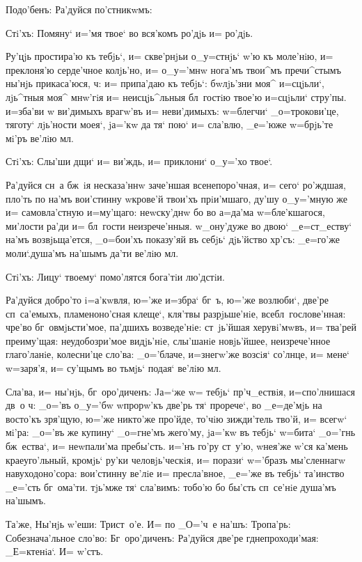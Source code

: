 Подо'бенъ: Ра'дуйся по'стникwмъ:

Стi'хъ: Помяну` и='мя твое` во вся'комъ ро'дjь и= 
ро'дjь. 

Ру'цjь простира'ю къ тебjь`, и= скве'рнjьи о_у=стнjь` 
w'ю къ моле'нiю, и= преклоня'ю серде'чное 
колjь'но, и= о_у='мнw нога'мъ твои^мъ пречи^стымъ ны'нjь 
прикаса'юся, ч: и= припа'даю къ тебjь`: бwлjь'зни 
моя^ и=сцjьли`, лjь^тныя моя^ мнw'гiя и= неисцjь^льныя 
бл~гостiю твое'ю и=сцjьли` стру'пы. и=зба'ви w\т 
ви'димыхъ врагw'въ и= неви'димыхъ: w=блегчи` 
_о=трокови'це, тяготу` лjь'ности моея`, jа='кw да тя` 
пою` и= сла'влю, _е='юже w=брjь'те мi'ръ ве'лiю мл. 

Стi'хъ: Слы'ши дщи` и= ви'ждь, и= приклони` о_у='хо 
твое`. 

Ра'дуйся сн~а бж~iя несказа'ннw заче'ншая 
всенепоро'чная, и= сего` ро'ждшая, пло'ть по на'мъ 
вои'стинну w\т крове'й твои'хъ прiи'мшаго, ду'шу 
о_у='мную же и= самовла'стную и=му'щаго: неwску'днw бо во 
а=да'ма w=бле'кшагося, ми'лости ра'ди и= бл~гости 
неизрече'нныя. w\т_ону'дуже во двою` _е=ст_еству` на'мъ 
возвjьща'ется, _о=бои'хъ показу'яй въ себjь` дjь'йство 
хр'съ: _е=го'же моли`.душа'мъ на'шымъ да'ти ве'лiю 
мл.

Стi'хъ: Лицу` твоему` помо'лятся бога'тiи лю'дстiи. 

Ра'дуйся добро'то i=а'кwвля, ю='же и=збра` бг~ъ, ю='же 
возлюби`, две'ре сп~са'емыхъ, пламеноно'сная клеще`, 
кля'твы разрjьше'нiе, всебл~гослове'нная: чре'во 
бг~овмjьсти'мое, па'дшихъ возведе'нiе: ст~jь'йшая 
херувi'мwвъ, и= тва'рей преиму'щая: неудобозри'мое 
видjь'нiе, слы'шанiе новjь'йшее, неизрече'нное 
глаго'ланiе, колесни'це сло'ва: _о='блаче, и=з\ъ негw'же 
возсiя` со'лнце, и= мене` w=заря'я, и= су'щымъ во тьмjь` 
подая` ве'лiю мл.

Сла'ва, и= ны'нjь, бг~оро'диченъ: Jа=`же w= тебjь` 
пр'ч_ествiя, и=спо'лнишася дв~о ч: _о='въ 
о_у='бw w\т прорw'къ две'рь тя` прорече`, во _е=де'мjь на 
восто'къ зря'щую, ю='же никто'же про'йде, то'чiю 
зижди'тель тво'й, и= всегw` мi'ра: _о='въ же купину` 
_о=гне'мъ жего'му, jа='кw въ тебjь` w=бита` _о='гнь 
бж~ества`, и= неwпали'ма пребы'сть. и='нъ го'ру ст~у'ю, 
w\т нея'же w'ся ка'мень краеуго'льный, кромjь` 
ру'ки человjь'ческiя, и= порази` w='бразъ мы'сленнагw 
навуходоно'сора: вои'стинну ве'лiе и= пресла'вное, _е='же 
въ тебjь` та'инство _е='сть бг~ома'ти. тjь'мже тя` 
сла'вимъ: тобо'ю бо бы'сть сп~се'нiе душа'мъ на'шымъ.

Та'же, Ны'нjь w'еши: Трист~о'е. И= по _О='ч~е 
на'шъ: Тропа'рь: Собезнача'льное сло'во: Бг~оро'диченъ: 
Ра'дуйся две'ре гд непроходи'мая: _Е=ктенiа`. И= 
w'стъ.
